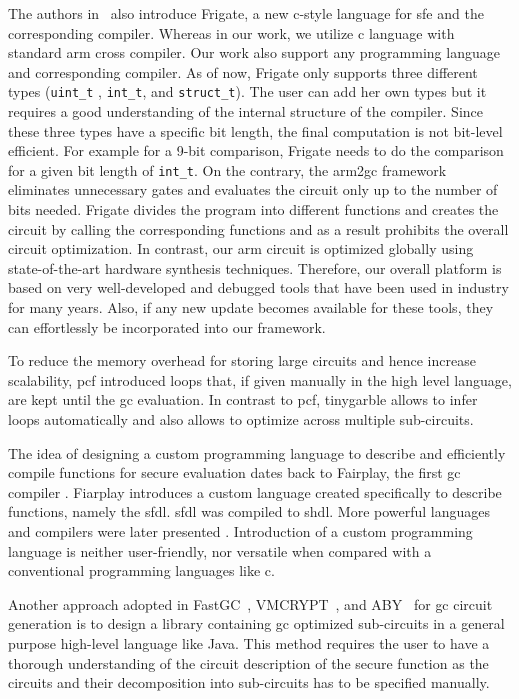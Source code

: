 The authors in~\cite{mood2016frigate} also introduce Frigate, a new \gls{c}-style language for \acrshort{sfe} and the corresponding compiler.
Whereas in our work, we utilize \gls{c} language with standard \gls{arm} cross compiler.
Our work also support any programming language and corresponding compiler.
As of now, Frigate only supports three different types (\texttt{uint\_t} , \texttt{int\_t}, and \texttt{struct\_t}).
The user can add her own types but it requires a good understanding of the internal structure of the compiler.
Since these three types have a specific bit length, the final computation is not bit-level efficient.
For example for a 9-bit comparison, Frigate needs to do the comparison for a given bit length of \texttt{int\_t}.
On the contrary, the \gls{arm2gc} framework eliminates unnecessary gates and evaluates the circuit only up to the number of bits needed.
Frigate divides the program into different functions and creates the circuit by calling the corresponding functions and as a result prohibits the overall circuit optimization.
In contrast, our \gls{arm} circuit is optimized globally using state-of-the-art hardware synthesis techniques.
Therefore, our overall platform is based on very well-developed and debugged tools that have been used in industry for many years.
Also, if any new update becomes available for these tools, they can effortlessly be incorporated into our framework.


To reduce the memory overhead for storing large circuits and hence increase scalability, \gls{pcf} \cite{kreuter2013pcf} introduced loops that, if given manually in the high level language, are kept until the \acrshort{gc} evaluation.
In contrast to \gls{pcf}, \gls{tinygarble} allows to infer loops automatically and also allows to optimize across multiple sub-circuits.

The idea of designing a custom programming language to describe and efficiently compile functions for secure evaluation dates back to Fairplay, the first \acrshort{gc} compiler \cite{malkhi2004fairplay}.
Fiarplay introduces a custom language created specifically to describe functions, namely the \acrfull{sfdl}.
\acrshort{sfdl} was compiled to \acrfull{shdl}.
More powerful languages and compilers were later presented \cite{henecka2010tasty, kreuter2012billion, rastogi2014wysteria}.
Introduction of a custom programming language is neither user-friendly, nor versatile when compared with a conventional programming languages like \gls{c}.

Another approach adopted in FastGC~\cite{huang2011faster, henecka2013faster}, VMCRYPT~\cite{malka2011vmcrypt}, and ABY~\cite{demmler2015aby} for \acrshort{gc} circuit generation is to design a library containing \acrshort{gc} optimized sub-circuits in a general purpose high-level language like Java.
This method requires the user to have a thorough understanding of the circuit description of the secure function as the circuits and their decomposition into sub-circuits has to be specified manually.

